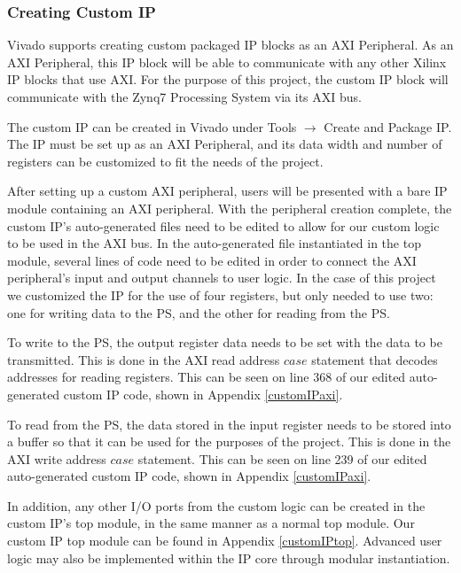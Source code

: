 \subsubsection{Creating Custom IP} \label{sssec:creatingCustomIP}
Vivado supports creating custom packaged IP blocks as an AXI Peripheral. As an AXI Peripheral, this IP block will be able to communicate with any other Xilinx IP blocks that use AXI. For the purpose of this project, the custom IP block will communicate with the Zynq7 Processing System via its AXI bus.
\par
The custom IP can be created in Vivado under Tools $\rightarrow$ Create and Package IP. The IP must be set up as an AXI Peripheral, and its data width and number of registers can be customized to fit the needs of the project.
\par
After setting up a custom AXI peripheral, users will be presented with a bare IP module containing an AXI peripheral. With the peripheral creation complete, the custom IP's auto-generated files need to be edited to allow for our custom logic to be used in the AXI bus. In the auto-generated file instantiated in the top module, several lines of code need to be edited in order to connect the AXI peripheral's input and output channels to user logic. In the case of this project we customized the IP for the use of four registers, but only needed to use two: one for writing data to the PS, and the other for reading from the PS. 
\par
To write to the PS, the output register data needs to be set with the data to be transmitted. This is done in the AXI read address $case$ statement that decodes addresses for reading registers. This can be seen on line 368 of our edited auto-generated custom IP code, shown in Appendix \ref{customIPaxi}.
\par
To read from the PS, the data stored in the input register needs to be stored into a buffer so that it can be used for the purposes of the project. This is done in the AXI write address $case$ statement. This can be seen on line 239 of our edited auto-generated custom IP code, shown in Appendix \ref{customIPaxi}.
\par
In addition, any other I/O ports from the custom logic can be created in the custom IP's top module, in the same manner as a normal top module. Our custom IP top module can be found in Appendix \ref{customIPtop}. Advanced user logic may also be implemented within the IP core through modular instantiation.

